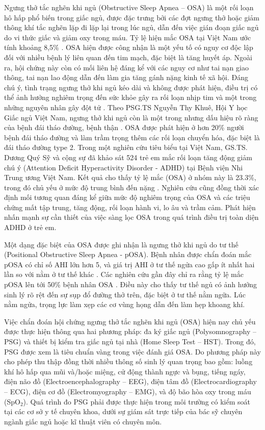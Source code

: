 Ngưng thở tắc nghẽn khi ngủ (Obstructive Sleep Apnea – OSA) là một rối loạn hô hấp phổ biến trong giấc ngủ, được đặc trưng bởi các đợt ngưng thở hoặc giảm thông khí tắc nghẽn lặp đi lặp lại trong lúc ngủ, dẫn đến việc gián đoạn giấc ngủ do vi thức giấc và giảm oxy trong máu.  Tỷ lệ hiện mắc OSA tại Việt Nam ước tính khoảng 8,5\% \cite{nguoimacOSA_VN}. OSA hiện được công nhận là một yếu tố có nguy cơ độc lập đối với nhiều bệnh lý liên quan đến tim mạch, đặc biệt là tăng huyết áp. Ngoài ra, hội chứng này còn có mối liên hệ đáng kể với các nguy cơ như tai nạn giao thông, tai nạn lao động dẫn đến làm gia tăng gánh nặng kinh tế xã hội\cite{osa_bike}\cite{Marin2005}\cite{drive_osa}. Đáng chú ý, tình trạng ngưng thở khi ngủ kéo dài và không được phát hiện, điều trị có thể ảnh hưởng nghiêm trọng đến sức khỏe gây ra rối loạn nhịp tim và một trong những nguyên nhân gây đột tử \cite{sumarry_osa}. Theo PSG.TS Nguyễn Thy Khuê, Hội Y học Giấc ngủ Việt Nam, ngưng thở khi ngủ còn là một trong nhưng dấu hiệu rõ ràng của bệnh đái tháo đường, bệnh thận \cite{bsThyKhue}. OSA được phát hiện ở hơn 20\% người bệnh đái tháo đường và làm trầm trọng thêm các rối loạn chuyển hóa, đặc biệt là đái tháo đường type 2. Trong một nghiên cứu tiêu biểu tại Việt Nam, GS.TS. Dương Quý Sỹ và cộng sự đã khảo sát 524 trẻ em mắc rối loạn tăng động giảm chú ý (Attention Deficit Hyperactivity Disorder - ADHD) tại Bệnh viện Nhi Trung ương Việt Nam. Kết quả cho thấy tỷ lệ mắc (OSA) ở nhóm này là 23.3\%, trong đó chủ yếu ở mức độ trung bình đến nặng \cite{ThaySUCHildren}. Nghiên cứu cũng đồng thời xác định mối tương quan đáng kể giữa mức độ nghiêm trọng của OSA và các triệu chứng mất tập trung, tăng động, rối loạn hành vi, lo âu và trầm cảm. Phát hiện nhấn mạnh sự cần thiết của việc sàng lọc OSA trong quá trình điều trị toàn diện ADHD ở trẻ em. 

Một dạng đặc biệt của OSA được ghi nhận là ngưng thở khi ngủ do tư thế (Positional Obstructive Sleep Apnea - pOSA). Bệnh nhân được chẩn đoán mắc pOSA có chỉ số AHI lớn hơn 5, và giá trị AHI ở tư thế ngửa cao gấp ít nhất hai lần so với nằm ở tư thế khác \cite{heinzer2018}. Các nghiên cứu gần đây chỉ ra rằng tỷ lệ mắc pOSA lên tới 50\% bệnh nhân OSA \cite{sabil2020}. Điều này cho thấy tư thế ngủ có ảnh hưởng sinh lý rõ rệt đến sự sụp đổ đường thở trên, đặc biệt ở tư thế nằm ngữa. Lúc nằm ngửa, trọng lực làm xẹp các cơ vùng họng dẫn đến làm hẹp khoang khí.

Việc chẩn đoán hội chứng ngưng thở tắc nghẽn khi ngủ (OSA) hiện nay chủ yếu được thực hiện thông qua hai phương pháp: đa ký giấc ngủ (Polysomnography – PSG) và thiết bị kiểm tra giấc ngủ tại nhà (Home Sleep Test – HST). Trong đó, PSG được xem là tiêu chuẩn vàng trong việc đánh giá OSA. Do phương pháp này cho phép thu thập đồng thời nhiều thông số sinh lý quan trọng bao gồm: luồng khí hô hấp qua mũi và/hoặc miệng, cử động thành ngực và bụng, tiếng ngáy, điện não đồ (Electroencephalography – EEG), điện tâm đồ (Electrocardiography – ECG), điện cơ đồ (Electromyography – EMG), và độ bão hòa oxy trong máu (SpO$_2$). Quá trình đo PSG phải được thực hiện trong môi trường có kiểm soát tại các cơ sở y tế chuyên khoa, dưới sự giám sát trực tiếp của bác sỹ chuyên ngành giấc ngủ hoặc kĩ thuật viên có chuyên môn\cite{psg_paper}\cite{kushida2005psg}. 

